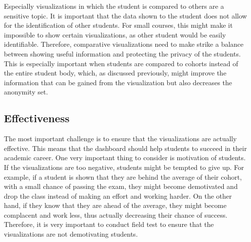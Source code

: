 Especially visualizations in which the student is compared to others are a sensitive topic. It is important that the data shown to the student does not allow for the identification of other students. For small courses, this might make it impossible to show certain visualizations, as other student would be easily identifiable.
Therefore, comparative visualizations need to make strike a balance between showing useful information and protecting the privacy of the students. This is especially important when students are compared to cohorts instead of the entire student body, which, as discussed previously, might improve the information that can be gained from the visualization but also decreases the anonymity set.

\subsection{Effectiveness}

The most important challenge is to ensure that the visualizations are actually effective. This means that the dashboard should help students to succeed in their academic career. One very important thing to consider is motivation of students.
If the visualizations are too negative, students might be tempted to give up. For example, if a student is shown that they are behind the average of their cohort, with a small chance of passing the exam, they might become demotivated and drop the class instead of making an effort and working harder.
On the other hand, if they know that they are ahead of the average, they might become complacent and work less, thus actually decreasing their chance of success.
Therefore, it is very important to conduct field test to ensure that the visualizations are not demotivating students.
